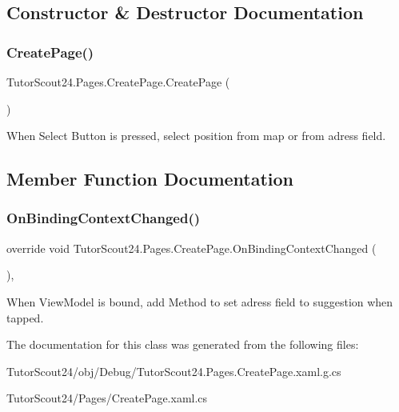 \subsection{Constructor \& Destructor Documentation}
\mbox{\label{class_tutor_scout24_1_1_pages_1_1_create_page_aa64fe5937ca79ba707dac9503ca26935}} 
\subsubsection{\texorpdfstring{Create\+Page()}{CreatePage()}}
{\footnotesize\ttfamily Tutor\+Scout24.\+Pages.\+Create\+Page.\+Create\+Page (\begin{DoxyParamCaption}{ }\end{DoxyParamCaption})\hspace{0.3cm}{\ttfamily [inline]}}



When Select Button is pressed, select position from map or from adress field. 



\subsection{Member Function Documentation}
\mbox{\label{class_tutor_scout24_1_1_pages_1_1_create_page_a0ce7b1aa53bf805acc40462094978ec9}} 
\subsubsection{\texorpdfstring{On\+Binding\+Context\+Changed()}{OnBindingContextChanged()}}
{\footnotesize\ttfamily override void Tutor\+Scout24.\+Pages.\+Create\+Page.\+On\+Binding\+Context\+Changed (\begin{DoxyParamCaption}{ }\end{DoxyParamCaption})\hspace{0.3cm}{\ttfamily [inline]}, {\ttfamily [protected]}}



When View\+Model is bound, add Method to set adress field to suggestion when tapped. 



The documentation for this class was generated from the following files\+:\begin{DoxyCompactItemize}
\item 
Tutor\+Scout24/obj/\+Debug/Tutor\+Scout24.\+Pages.\+Create\+Page.\+xaml.\+g.\+cs\item 
Tutor\+Scout24/\+Pages/Create\+Page.\+xaml.\+cs\end{DoxyCompactItemize}
